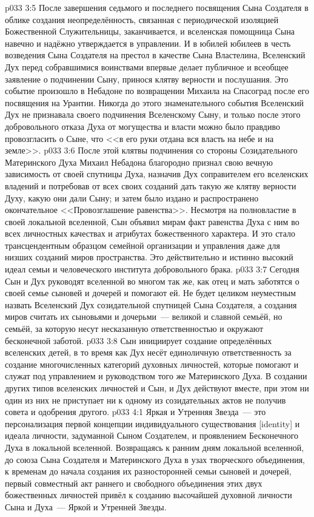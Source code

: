 \vs p033 3:5 После завершения седьмого и последнего посвящения Сына Создателя в облике создания неопределённость, связанная с периодической изоляцией Божественной Служительницы, заканчивается, и вселенская помощница Сына навечно и надёжно утверждается в управлении. И в юбилей юбилеев в честь возведения Сына Создателя на престол в качестве Сына Властелина, Вселенский Дух перед собравшимися воинствами впервые делает публичное и всеобщее заявление о подчинении Сыну, принося клятву верности и послушания. Это событие произошло в Небадоне по возвращении Михаила на Спасоград после его посвящения на Урантии. Никогда до этого знаменательного события Вселенский Дух не признавала своего подчинения Вселенскому Сыну, и только после этого добровольного отказа Духа от могущества и власти можно было правдиво провозгласить о Сыне, что <<в его руки отдана вся власть на небе и на земле>>.
\vs p033 3:6 После этой клятвы подчинения со стороны Созидательного Материнского Духа Михаил Небадона благородно признал свою вечную зависимость от своей спутницы Духа, назначив Дух соправителем его вселенских владений и потребовав от всех своих созданий дать такую же клятву верности Духу, какую они дали Сыну; и затем было издано и распространено окончательное <<Провозглашение равенства>>. Несмотря на полновластие в своей локальной вселенной, Сын объявил мирам факт равенства Духа с ним во всех личностных качествах и атрибутах божественного характера. И это стало трансцендентным образцом семейной организации и управления даже для низших созданий миров пространства. Это действительно и истинно высокий идеал семьи и человеческого института добровольного брака.
\vs p033 3:7 Сегодня Сын и Дух руководят вселенной во многом так же, как отец и мать заботятся о своей семье сыновей и дочерей и помогают ей. Не будет целиком неуместным назвать Вселенский Дух созидательной спутницей Сына Создателя, а создания миров считать их сыновьями и дочерьми~--- великой и славной семьёй, но семьёй, за которую несут несказанную ответственностью и окружают бесконечной заботой.
\vs p033 3:8 \pc Сын инициирует создание определённых вселенских детей, в то время как Дух несёт единоличную ответственность за создание многочисленных категорий духовных личностей, которые помогают и служат под управлением и руководством того же Материнского Духа. В создании других типов вселенских личностей и Сын, и Дух действуют вместе, при этом ни один из них не приступает ни к одному из созидательных актов не получив совета и одобрения другого.
\vs p033 4:1 Яркая и Утренняя Звезда~--- это персонализация первой концепции индивидуального существования [identity] и идеала личности, задуманной Сыном Создателем, и проявлением Бесконечного Духа в локальной вселенной. Возвращаясь к ранним дням локальной вселенной, до союза Сына Создателя и Материнского Духа в узах творческого объединения, к временам до начала создания их разносторонней семьи сыновей и дочерей, первый совместный акт раннего и свободного объединения этих двух божественных личностей привёл к созданию высочайшей духовной личности Сына и Духа~--- Яркой и Утренней Звезды.
